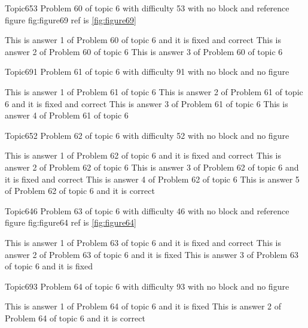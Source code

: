 \documentclass[master]{exam}
\begin{document}
\begin{problem}{Topic6}{53}
	Problem 60 of topic 6 with difficulty 53 with no block and reference figure fig:figure69 ref is \ref{fig:figure69}
	\begin{answers}
		 This is answer 1 of Problem 60 of topic 6 and it is fixed and correct
		\answer This is answer 2 of Problem 60 of topic 6 
		\answer This is answer 3 of Problem 60 of topic 6 
	\end{answers}
\end{problem}

\begin{problem}{Topic6}{91}
	Problem 61 of topic 6 with difficulty 91 with no block and no figure
	\begin{answers}
		\answer This is answer 1 of Problem 61 of topic 6 
		 This is answer 2 of Problem 61 of topic 6 and it is fixed and correct
		\answer This is answer 3 of Problem 61 of topic 6 
		\answer This is answer 4 of Problem 61 of topic 6 
	\end{answers}
\end{problem}

\begin{problem}{Topic6}{52}
	Problem 62 of topic 6 with difficulty 52 with no block and no figure
	\begin{answers}
		 This is answer 1 of Problem 62 of topic 6 and it is fixed and correct
		\answer This is answer 2 of Problem 62 of topic 6 
		 This is answer 3 of Problem 62 of topic 6 and it is fixed and correct
		\answer This is answer 4 of Problem 62 of topic 6 
		\answer[correct] This is answer 5 of Problem 62 of topic 6 and it is correct
	\end{answers}
\end{problem}

\begin{problem}{Topic6}{46}
	Problem 63 of topic 6 with difficulty 46 with no block and reference figure fig:figure64 ref is \ref{fig:figure64}
	\begin{answers}
		 This is answer 1 of Problem 63 of topic 6 and it is fixed and correct
		\answer[fixed] This is answer 2 of Problem 63 of topic 6 and it is fixed
		\answer[fixed] This is answer 3 of Problem 63 of topic 6 and it is fixed
	\end{answers}
\end{problem}

\begin{problem}{Topic6}{93}
	Problem 64 of topic 6 with difficulty 93 with no block and no figure
	\begin{answers}
		\answer[fixed] This is answer 1 of Problem 64 of topic 6 and it is fixed
		\answer[correct] This is answer 2 of Problem 64 of topic 6 and it is correct
	\end{answers}
\end{problem}
\end{document}
